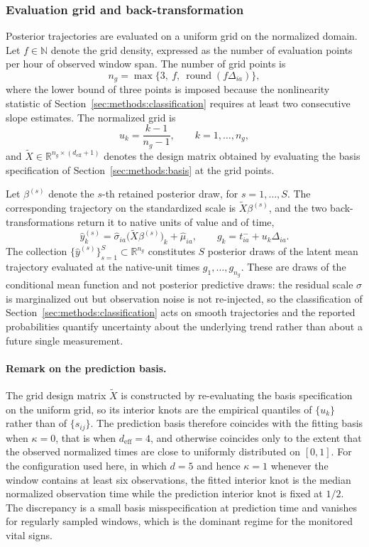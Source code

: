 \subsubsection{Evaluation grid and back-transformation}
\label{sec:methods:grid}

Posterior trajectories are evaluated on a uniform grid on the normalized domain. Let $f\in\mathbb{N}$ denote the grid density, expressed as the number of evaluation points per hour of observed window span. The number of grid points is
$$n_g=\max\bigl\{3,\ f,\ \operatorname{round}(f\Delta_{ia})\bigr\},$$
where the lower bound of three points is imposed because the nonlinearity statistic of Section~\ref{sec:methods:classification} requires at least two consecutive slope estimates. The normalized grid is
$$u_k=\frac{k-1}{n_g-1},\qquad k=1,\dots,n_g,$$
and $\tilde{X}\in\mathbb{R}^{n_g\times(d_{\mathrm{eff}}+1)}$ denotes the design matrix obtained by evaluating the basis specification of Section~\ref{sec:methods:basis} at the grid points.

Let $\beta^{(s)}$ denote the $s$-th retained posterior draw, for $s=1,\dots,S$. The corresponding trajectory on the standardized scale is $\tilde{X}\beta^{(s)}$, and the two back-transformations return it to native units of value and of time,
$$\hat{y}^{(s)}_k=\hat{\sigma}_{ia}\bigl(\tilde{X}\beta^{(s)}\bigr)_k+\hat{\mu}_{ia},\qquad g_k=t_{ia}^-+u_k\Delta_{ia}.$$
The collection $\{\hat{y}^{(s)}\}_{s=1}^{S}\subset\mathbb{R}^{n_g}$ constitutes $S$ posterior draws of the latent mean trajectory evaluated at the native-unit times $g_1,\dots,g_{n_g}$. These are draws of the conditional mean function and not posterior predictive draws: the residual scale $\sigma$ is marginalized out but observation noise is not re-injected, so the classification of Section~\ref{sec:methods:classification} acts on smooth trajectories and the reported probabilities quantify uncertainty about the underlying trend rather than about a future single measurement.

\paragraph{Remark on the prediction basis.} The grid design matrix $\tilde{X}$ is constructed by re-evaluating the basis specification on the uniform grid, so its interior knots are the empirical quantiles of $\{u_k\}$ rather than of $\{s_{ij}\}$. The prediction basis therefore coincides with the fitting basis when $\kappa=0$, that is when $d_{\mathrm{eff}}=4$, and otherwise coincides only to the extent that the observed normalized times are close to uniformly distributed on $[0,1]$. For the configuration used here, in which $d=5$ and hence $\kappa=1$ whenever the window contains at least six observations, the fitted interior knot is the median normalized observation time while the prediction interior knot is fixed at $1/2$. The discrepancy is a small basis misspecification at prediction time and vanishes for regularly sampled windows, which is the dominant regime for the monitored vital signs.

